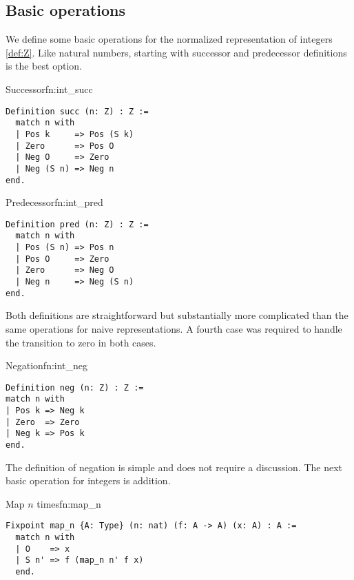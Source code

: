 \subsection{Basic operations}
We define some basic operations for the normalized representation of integers \ref{def:Z}. Like natural numbers, starting with successor and predecessor definitions is the best option.
\begin{func}{Successor}{fn:int_succ}
\begin{verbatim}
Definition succ (n: Z) : Z :=
  match n with
  | Pos k     => Pos (S k)
  | Zero      => Pos O
  | Neg O     => Zero
  | Neg (S n) => Neg n
end.
\end{verbatim}
\end{func}
\begin{func}{Predecessor}{fn:int_pred}
\begin{verbatim}
Definition pred (n: Z) : Z :=
  match n with
  | Pos (S n) => Pos n
  | Pos O     => Zero
  | Zero      => Neg O
  | Neg n     => Neg (S n)
end.
\end{verbatim}
\end{func}
Both definitions are straightforward but substantially more complicated than the same operations for naive representations. A fourth case was required to handle the transition to zero in both cases.
\begin{func}{Negation}{fn:int_neg}
\begin{verbatim}
Definition neg (n: Z) : Z :=
match n with
| Pos k => Neg k
| Zero  => Zero
| Neg k => Pos k
end.
\end{verbatim}
\end{func}
The definition of negation is simple and does not require a discussion. The next basic operation for integers is addition.
\begin{func}{Map $n$ times}{fn:map_n}
\begin{verbatim}
Fixpoint map_n {A: Type} (n: nat) (f: A -> A) (x: A) : A :=
  match n with
  | O    => x
  | S n' => f (map_n n' f x)
  end.
\end{verbatim}
\end{func}
  
